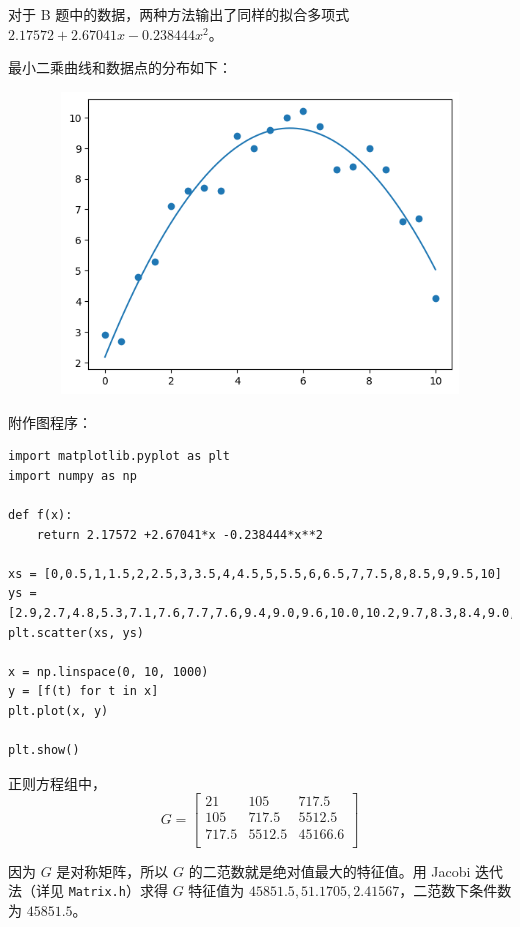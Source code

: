 \documentclass{ctexart}
\begin{document}
对于 B 题中的数据，两种方法输出了同样的拟合多项式 $2.17572 +2.67041x -0.238444x^2$。

最小二乘曲线和数据点的分布如下：

\begin{figure}[h]
    \begin{minipage}{4cm}
	\includegraphics[width = 12cm, height = 8cm]{1.png}
	\label{fig1}
	\end{minipage}
\end{figure}

附作图程序：

\begin{verbatim}
import matplotlib.pyplot as plt
import numpy as np

def f(x):
    return 2.17572 +2.67041*x -0.238444*x**2

xs = [0,0.5,1,1.5,2,2.5,3,3.5,4,4.5,5,5.5,6,6.5,7,7.5,8,8.5,9,9.5,10]
ys = [2.9,2.7,4.8,5.3,7.1,7.6,7.7,7.6,9.4,9.0,9.6,10.0,10.2,9.7,8.3,8.4,9.0,8.3,6.6,6.7,4.1]
plt.scatter(xs, ys)

x = np.linspace(0, 10, 1000)
y = [f(t) for t in x]
plt.plot(x, y)

plt.show()
\end{verbatim}

正则方程组中，
\begin{equation}
G=
\begin{bmatrix}
21 & 105 & 717.5 \\
105 & 717.5 & 5512.5 \\
717.5 & 5512.5 & 45166.6 \\
\end{bmatrix}
\end{equation}

因为 $G$ 是对称矩阵，所以 $G$ 的二范数就是绝对值最大的特征值。用 Jacobi 迭代法（详见 \verb|Matrix.h|）求得 $G$ 特征值为 $45851.5,51.1705,2.41567$，二范数下条件数为 $45851.5$。
\end{document}
